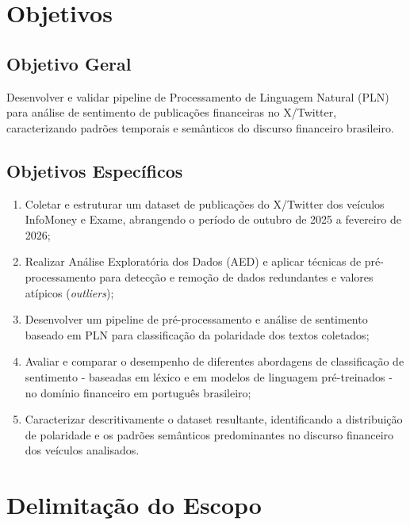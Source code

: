 \section{Objetivos}\label{sec:objetivos}

\subsection{Objetivo Geral}

Desenvolver e validar pipeline de Processamento de Linguagem Natural (PLN) para análise de sentimento de publicações financeiras no X/Twitter, caracterizando padrões temporais e semânticos do discurso financeiro brasileiro.

\subsection{Objetivos Específicos}

\begin{enumerate}
	\item Coletar e estruturar um dataset de publicações do X/Twitter dos veículos InfoMoney e Exame, abrangendo o período de outubro de 2025 a fevereiro de 2026;
	
	\item Realizar Análise Exploratória dos Dados (AED) e aplicar técnicas de pré-processamento para detecção e remoção de dados redundantes e valores atípicos (\textit{outliers});
	
	\item Desenvolver um pipeline de pré-processamento e análise de sentimento baseado em PLN para classificação da polaridade dos textos coletados;
	
	\item Avaliar e comparar o desempenho de diferentes abordagens de classificação de sentimento - baseadas em léxico e em modelos de linguagem pré-treinados - no domínio financeiro em português brasileiro;
	
	\item Caracterizar descritivamente o dataset resultante, identificando a distribuição de polaridade e os padrões semânticos predominantes no discurso financeiro dos veículos analisados.
	
\end{enumerate}


\section{Delimitação do Escopo}

